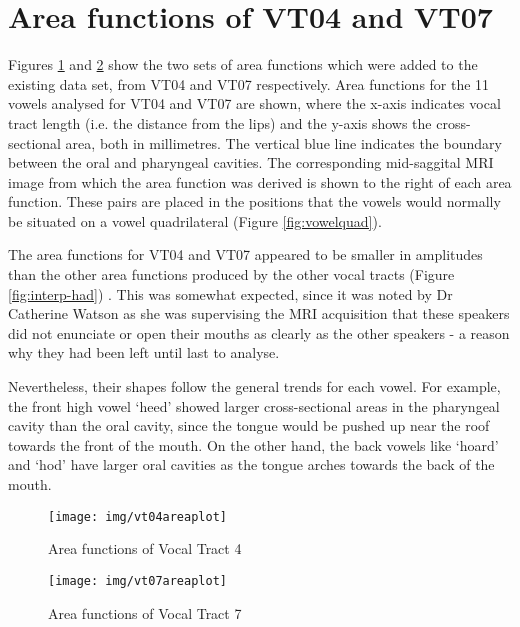 \section{Area functions of VT04 and VT07}\label{sec:results-areafunctions}

Figures \ref{fig:vt04area} and \ref{fig:vt07area} show the two sets of area functions which were added to the existing data set, from VT04 and VT07 respectively. Area functions for the 11 vowels analysed for VT04 and VT07 are shown, where the x-axis indicates vocal tract length (i.e. the distance from the lips) and the y-axis shows the cross-sectional area, both in millimetres. The vertical blue line indicates the boundary between the oral and pharyngeal cavities. The corresponding mid-saggital MRI image from which the area function was derived is shown to the right of each area function. These pairs are placed in the positions that the vowels would normally be situated on a vowel quadrilateral (Figure \ref{fig:vowelquad}).

The area functions for VT04 and VT07 appeared to be smaller in amplitudes than the other area functions produced by the other vocal tracts (Figure \ref{fig:interp-had}) \cite{helen}. This was somewhat expected, since it was noted by Dr Catherine Watson as she was supervising the MRI acquisition that these speakers did not enunciate or open their mouths as clearly as the other speakers - a reason why they had been left until last to analyse.

Nevertheless, their shapes follow the general trends for each vowel. For example, the front high vowel `heed' showed larger cross-sectional areas in the pharyngeal cavity than the oral cavity, since the tongue would be pushed up near the roof towards the front of the mouth. On the other hand, the back vowels like `hoard' and `hod' have larger oral cavities as the tongue arches towards the back of the mouth.

\begin{landscape}

\begin{figure}[b]
\centering
\hspace*{-1.5cm}
\texttt{[image: img/vt04areaplot]}
\caption{Area functions of Vocal Tract 4}
\label{fig:vt04area}
\end{figure}

\pagebreak

\begin{figure}[b]
\centering
\hspace*{-1.5cm}
\texttt{[image: img/vt07areaplot]}
\caption{Area functions of Vocal Tract 7}
\label{fig:vt07area}
\end{figure}

\end{landscape}

